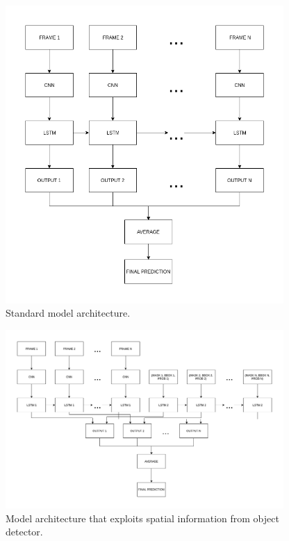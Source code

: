 \documentclass{scrartcl}
\begin{document}
\newpage
\begin{figure}[h!]
\centering
\includegraphics[width=400]{figures/model_standard.png}
\caption{Standard model architecture.}
\label{fig:1}
\end{figure}

\begin{figure}[h!]
\centering
\includegraphics[width=400]{figures/model_2.png}
\caption{Model architecture that exploits spatial information from object detector.}
\label{fig:2}
\end{figure}
\end{document}
